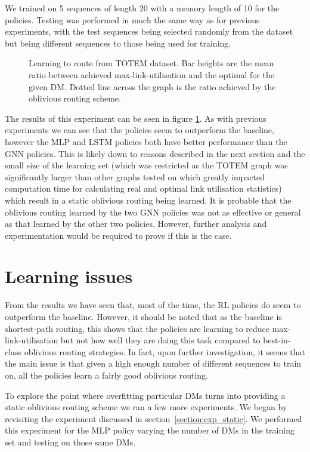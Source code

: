 We trained on 5 sequences of length 20 with a memory length of 10 for the policies. Testing was performed in much the same way as for previous experiments, with the test sequences being selected randomly from the dataset but being different sequences to those being used for training.

\begin{figure}
    \centering
    
    \caption{Learning to route from TOTEM dataset. Bar heights are the mean ratio between achieved max-link-utilisation and the optimal for the given DM. Dotted line across the graph is the ratio achieved by the oblivious routing scheme.}
    \label{fig:exp_real}
\end{figure}

The results of this experiment can be seen in figure \ref{fig:exp_real}. As with previous experiments we can see that the policies seem to outperform the baseline, however the MLP and LSTM policies both have better performance than the GNN policies. This is likely down to reasons described in the next section and the small size of the learning set (which was restricted as the TOTEM graph was significantly larger than other graphs tested on which greatly impacted computation time for calculating real and optimal link utilisation statistics) which result in a static oblivious routing being learned. It is probable that the oblivious routing learned by the two GNN policies was not as effective or general as that learned by the other two policies. However, further analysis and experimentation would be required to prove if this is the case.


\section{Learning issues}
\label{section:overfit}
From the results we have seen that, most of the time, the RL policies do seem to outperform the baseline. However, it should be noted that as the baseline is shortest-path routing, this shows that the policies are learning to reduce max-link-utilisation but not how well they are doing this task compared to best-in-class oblivious routing strategies. In fact, upon further investigation, it seems that the main issue is that given a high enough number of different sequences to train on, all the policies learn a fairly good oblivious routing.

To explore the point where overfitting particular DMs turns into providing a static oblivious routing scheme we ran a few more experiments. We began by revisiting the experiment discussed in section~\ref{section:exp_static}. We performed this experiment for the MLP policy varying the number of DMs in the training set and testing on those same DMs.

